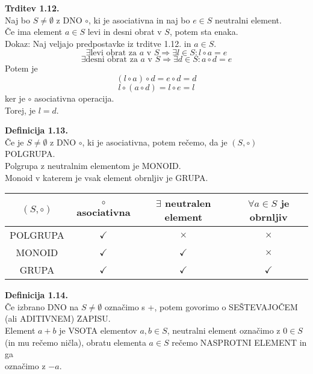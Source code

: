 \documentclass[12pt]{article}
\begin{document}
\vspace*{24pt}


\noindent
\textbf{Trditev 1.12.} \\
Naj bo $S \ne \emptyset$ z DNO $\circ$, ki je asociativna in naj bo $e \in S$ neutralni element. \\
Če ima element $a \in S$ levi in desni obrat v $S$, potem sta enaka. \\[1em]
Dokaz:
Naj veljajo predpostavke iz trditve 1.12. in $a \in S$. \\
$$ \exists \text{levi obrat za } a \text{ v } S \Rightarrow \exists l \in S: l \circ a = e $$
$$ \exists \text{desni obrat za } a \text{ v } S \Rightarrow \exists d \in S: a \circ d = e $$
Potem je
$$ (l \circ a) \circ d = e \circ d = d $$
$$ l \circ (a \circ d) = l \circ e = l $$
ker je $\circ$ asociativna operacija. \\
Torej, je $l = d$.



\vspace*{24pt}


\noindent
\textbf{Definicija 1.13.} \\
Če je $S \ne \emptyset$ z DNO $\circ$, ki je asociativna, potem rečemo, da je $(S, \circ)$ POLGRUPA. \\
Polgrupa z neutralnim elementom je MONOID. \\
Monoid v katerem je vsak element obrnljiv je GRUPA. \\

\begin{tabular}{|c|c|c|c|}
    \hline
    $(S, \circ)$ & $\circ$ asociativna & $\exists$ neutralen element & $\forall a \in S$ je obrnljiv \\
    \hline
    POLGRUPA & $\checkmark$ & $\times$ & $\times$ \\
    \hline
    MONOID & $\checkmark$ & $\checkmark$ & $\times$ \\
    \hline
    GRUPA & $\checkmark$ & $\checkmark$ & $\checkmark$ \\
    \hline
\end{tabular}



\vspace*{24pt}


\noindent
\textbf{Definicija 1.14.} \\
Če izbrano DNO na $S \ne \emptyset$ označimo s +, potem govorimo o SEŠTEVAJOČEM \\
(ali ADITIVNEM) ZAPISU. \\
Element $a + b$ je VSOTA elementov $a, b \in S$, neutralni element označimo z $0 \in S$ \\
(in mu rečemo ničla), obratu elementa $a \in S$ rečemo NASPROTNI ELEMENT in ga \\
označimo z $-a$. \\[1em]
\end{document}
